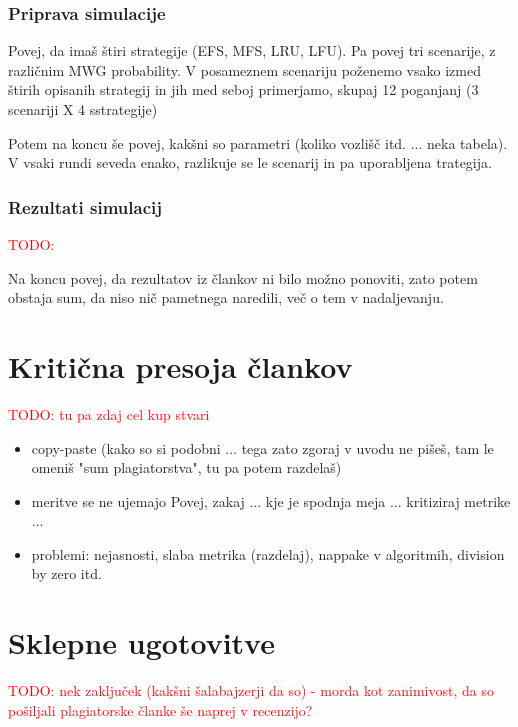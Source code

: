 \documentclass[a4paper, 12pt]{book}
\newcommand{\TODO}[1]{\textcolor{red}{TODO: #1}}
\begin{document}
\subsection{Priprava simulacije}
Povej, da imaš štiri strategije (EFS, MFS, LRU, LFU). Pa povej tri scenarije,
z različnim MWG probability. V posameznem scenariju poženemo vsako izmed
štirih opisanih strategij in jih med seboj primerjamo, skupaj 12 poganjanj
(3 scenariji X 4 sstrategije)

Potem na koncu še povej, kakšni so parametri (koliko vozlišč itd. ... neka
tabela). V vsaki rundi seveda enako, razlikuje se le scenarij in pa
uporabljena trategija.

\subsection{Rezultati simulacij}

\TODO{}

Na koncu povej, da rezultatov iz člankov ni bilo možno ponoviti, zato potem
obstaja sum, da niso nič pametnega naredili, več o tem v nadaljevanju.

\chapter{Kritična presoja člankov}

\TODO{tu pa zdaj cel kup stvari}

\begin{itemize}
\item copy-paste (kako so si podobni ... tega zato zgoraj v uvodu ne pišeš, tam
le omeniš "sum plagiatorstva", tu pa potem razdelaš)

\item meritve se ne ujemajo
Povej, zakaj ... kje je spodnja meja ... kritiziraj metrike ...

\item problemi: nejasnosti, slaba metrika (razdelaj), nappake v algoritmih,
division by zero itd.

\end{itemize}


\chapter{Sklepne ugotovitve}
\TODO{nek zaključek (kakšni šalabajzerji da so) - morda kot zanimivost, da
so pošiljali plagiatorske članke še naprej v recenzijo?}
\end{document}
